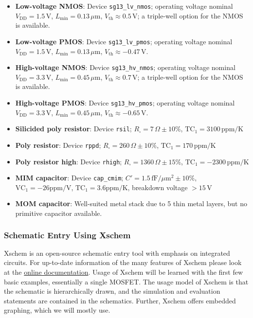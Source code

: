 \documentclass[
  a4paper,
  DIV=11,
  numbers=noendperiod]{scrartcl}
\providecommand{\tightlist}{%
  \setlength{\itemsep}{0pt}\setlength{\parskip}{0pt}}\usepackage{longtable,booktabs,array}
\begin{document}
\begin{itemize}
\tightlist
\item
  \textbf{Low-voltage NMOS}: Device \texttt{sg13\_lv\_nmos}; operating
  voltage nominal \(V_\mathrm{DD}=1.5\,\text{V}\),
  \(L_\mathrm{min}=0.13\,\mu\text{m}\),
  \(V_\mathrm{th} \approx 0.5\,\text{V}\); a triple-well option for the
  NMOS is available.
\item
  \textbf{Low-voltage PMOS}: Device \texttt{sg13\_lv\_pmos}; operating
  voltage nominal \(V_\mathrm{DD}=1.5\,\text{V}\),
  \(L_\mathrm{min}=0.13\,\mu\text{m}\),
  \(V_\mathrm{th} \approx -0.47\,\text{V}\).
\item
  \textbf{High-voltage NMOS}: Device \texttt{sg13\_hv\_nmos}; operating
  voltage nominal \(V_\mathrm{DD}=3.3\,\text{V}\),
  \(L_\mathrm{min}=0.45\,\mu\text{m}\),
  \(V_\mathrm{th} \approx 0.7\,\text{V}\); a triple-well option for the
  NMOS is available.
\item
  \textbf{High-voltage PMOS}: Device \texttt{sg13\_hv\_pmos}; operating
  voltage nominal \(V_\mathrm{DD}=3.3\,\text{V}\),
  \(L_\mathrm{min}=0.45\,\mu\text{m}\),
  \(V_\mathrm{th} \approx -0.65\,\text{V}\).
\item
  \textbf{Silicided poly resistor}: Device \texttt{rsil};
  \(R_\square=7\,\Omega \pm 10\%\), \(\mathrm{TC}_1=3100\,\text{ppm/K}\)
\item
  \textbf{Poly resistor}: Device \texttt{rppd};
  \(R_\square=260\,\Omega \pm 10\%\),
  \(\mathrm{TC}_1=170\,\text{ppm/K}\)
\item
  \textbf{Poly resistor high}: Device \texttt{rhigh};
  \(R_\square=1360\,\Omega \pm 15\%\),
  \(\mathrm{TC}_1=-2300\,\text{ppm/K}\)
\item
  \textbf{MIM capacitor}: Device \texttt{cap\_cmim};
  \(C'=1.5\,\text{fF}/\mu\text{m}^2 \pm 10\%\),
  \(\mathrm{VC}_1=-26\text{ppm/V}\), \(\mathrm{TC}_1=3.6\text{ppm/K}\),
  breakdown voltage \(>15\,\mathrm{V}\)
\item
  \textbf{MOM capacitor}: Well-suited metal stack due to 5 thin metal
  layers, but no primitive capacitor available.
\end{itemize}

\subsubsection{Schematic Entry Using
Xschem}\label{schematic-entry-using-xschem}

Xschem is an open-source schematic entry tool with emphasis on
integrated circuits. For up-to-date information of the many features of
Xschem please look at the
\href{https://xschem.sourceforge.io/stefan/xschem_man/xschem_man.html}{online
documentation}. Usage of Xschem will be learned with the first few basic
examples, essentially a single MOSFET. The usage model of Xschem is that
the schematic is hierarchically drawn, and the simulation and evaluation
statements are contained in the schematics. Further, Xschem offers
embedded graphing, which we will mostly use.
\end{document}

